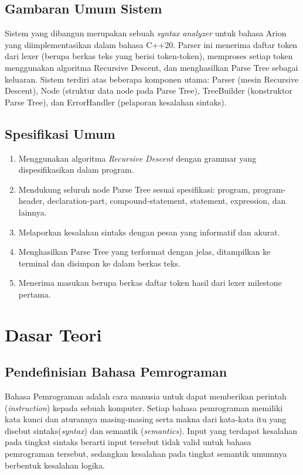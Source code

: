 \documentclass[12pt,a4paper]{article}
\begin{document}
\subsection{Gambaran Umum Sistem}
Sistem yang dibangun merupakan sebuah \textit{syntax analyzer} untuk bahasa Arion yang diimplementasikan dalam bahasa C++20. Parser ini menerima daftar token dari lexer (berupa berkas teks yang berisi token-token), memproses setiap token menggunakan algoritma Recursive Descent, dan menghasilkan Parse Tree sebagai keluaran. Sistem terdiri atas beberapa komponen utama: Parser (mesin Recursive Descent), Node (struktur data node pada Parse Tree), TreeBuilder (konstruktor Parse Tree), dan ErrorHandler (pelaporan kesalahan sintaks).

\subsection{Spesifikasi Umum}
\begin{enumerate}[label=\arabic*.]
  \item Menggunakan algoritma \textit{Recursive Descent} dengan grammar yang
      dispesifikasikan dalam program.
  \item Mendukung seluruh node Parse Tree sesuai spesifikasi: program, program-header, declaration-part, compound-statement, statement, expression, dan lainnya.
  \item Melaporkan kesalahan sintaks dengan pesan yang informatif dan akurat.
  \item Menghasilkan Parse Tree yang terformat dengan jelas, ditampilkan ke terminal dan disimpan ke dalam berkas teks.
  \item Menerima masukan berupa berkas daftar token hasil dari lexer milestone pertama.
\end{enumerate}


\section{Dasar Teori}

\subsection{Pendefinisian Bahasa Pemrograman}
Bahasa Pemrograman adalah cara manusia untuk dapat memberikan perintah
(\textit{instruction}) kepada sebuah komputer. Setiap bahasa pemrograman
memiliki kata kunci dan aturannya masing-masing serta makna dari kata-kata itu
yang disebut sintaks(\textit{syntax}) dan semantik (\textit{semantics}).
Input yang terdapat kesalahan pada tingkat sintaks berarti input tersebut tidak
valid untuk bahasa pemrograman tersebut, sedangkan kesalahan pada tingkat
semantik umumnya berbentuk kesalahan logika.
\end{document}
